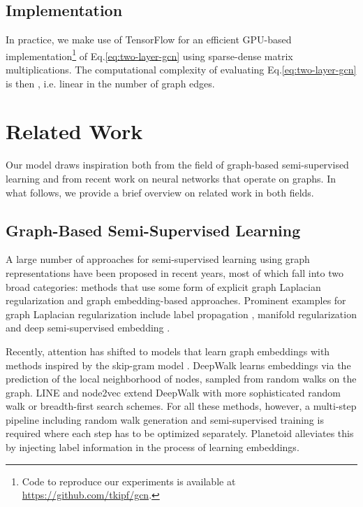 \documentclass{article} \usepackage{iclr2017_conference,times}
\makeatletter
\newcommand*{\ie}{i.e.\@\xspace}
\newcommand*{\eq}{Eq.\@\xspace}
\makeatother
\begin{document}
\subsection{Implementation} In practice, we make use of TensorFlow \citep{tensorflow2015-whitepaper} for an efficient GPU-based implementation\footnote{Code to reproduce our experiments is available at \url{https://github.com/tkipf/gcn}.} of \eq \ref{eq:two-layer-gcn} using sparse-dense matrix multiplications. The computational complexity of evaluating \eq \ref{eq:two-layer-gcn} is then , \ie linear in the number of graph edges.


\section{Related Work}
Our model draws inspiration both from the field of graph-based semi-supervised learning and from recent work on neural networks that operate on graphs. In what follows, we provide a brief overview on related work in both fields.

\subsection{Graph-Based Semi-Supervised Learning}
A large number of approaches for semi-supervised learning using graph representations have been proposed in recent years, most of which fall into two broad categories: methods that use some form of explicit graph Laplacian regularization and graph embedding-based approaches. Prominent examples for graph Laplacian regularization include label propagation \citep{zhu2003semi}, manifold regularization \citep{belkin2006manifold} and deep semi-supervised embedding \citep{weston2012deep}. 

Recently, attention has shifted to models that learn graph embeddings with methods inspired by the skip-gram model \citep{mikolov2013distributed}. DeepWalk \citep{perozzi2014deepwalk} learns embeddings via the prediction of the local neighborhood of nodes, sampled from random walks on the graph. LINE \citep{tang2015line} and node2vec \citep{grovernode2vec} extend DeepWalk with more sophisticated random walk or breadth-first search schemes. For all these methods, however, a multi-step pipeline including random walk generation and semi-supervised training is required where each step has to be optimized separately. Planetoid \citep{yang2016revisiting} alleviates this by injecting label information in the process of learning embeddings.
\end{document}

